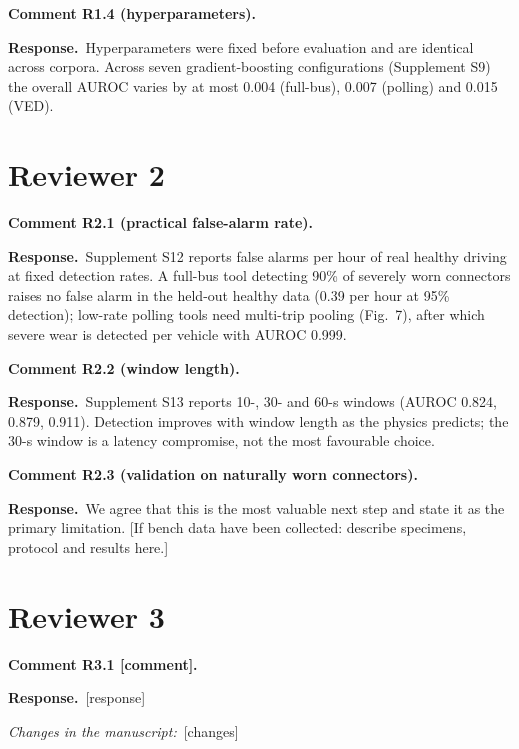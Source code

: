 \documentclass[11pt]{article}
\newcommand{\rc}[1]{\par\medskip\noindent\textbf{Comment #1.}\ }
\newcommand{\resp}{\par\noindent\textcolor{blue!60!black}{\textbf{Response.}}\ }
\newcommand{\chg}{\par\noindent\textit{Changes in the manuscript:}\ }
\begin{document}
\rc{R1.4 (hyperparameters)}
\resp Hyperparameters were fixed before evaluation and are identical across corpora. Across seven
gradient-boosting configurations (Supplement S9) the overall AUROC varies by at most 0.004
(full-bus), 0.007 (polling) and 0.015 (VED).

\section*{Reviewer 2}

\rc{R2.1 (practical false-alarm rate)}
\resp Supplement S12 reports false alarms per hour of real healthy driving at fixed detection
rates. A full-bus tool detecting 90\% of severely worn connectors raises no false alarm in the
held-out healthy data (0.39 per hour at 95\% detection); low-rate polling tools need multi-trip
pooling (Fig.~7), after which severe wear is detected per vehicle with AUROC 0.999.

\rc{R2.2 (window length)}
\resp Supplement S13 reports 10-, 30- and 60-s windows (AUROC 0.824, 0.879, 0.911). Detection
improves with window length as the physics predicts; the 30-s window is a latency compromise, not
the most favourable choice.

\rc{R2.3 (validation on naturally worn connectors)}
\resp We agree that this is the most valuable next step and state it as the primary limitation.
[If bench data have been collected: describe specimens, protocol and results here.]

\section*{Reviewer 3}

\rc{R3.1 [comment]}
\resp [response]
\chg [changes]
\end{document}
